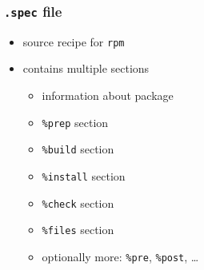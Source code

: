 \begin{frame}[t]
   \frametitle{\texttt{.spec} file}
   \begin{itemize}
      \item source recipe for \texttt{rpm}
      \item contains multiple sections
      \begin{itemize}
         \item information about package
         \item \texttt{\%prep} section
         \item \texttt{\%build} section
         \item \texttt{\%install} section
         \item \texttt{\%check} section
         \item \texttt{\%files} section
         \item optionally more: \texttt{\%pre}, \texttt{\%post}, \dots
      \end{itemize}
   \end{itemize}
\end{frame}

